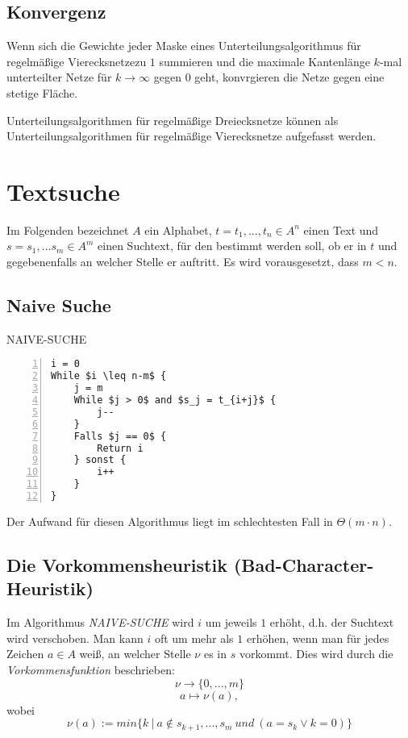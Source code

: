 \subsection{Konvergenz}
Wenn sich die Gewichte jeder Maske eines Unterteilungsalgorithmus für regelmäßige Vierecksnetzezu \(1\) summieren und die maximale Kantenlänge \(k\)-mal unterteilter Netze für \(k \rightarrow \infty\) gegen \(0\) geht, konvrgieren die Netze gegen eine stetige Fläche.

Unterteilungsalgorithmen für regelmäßige Dreiecksnetze können als Unterteilungsalgorithmen für regelmäßige Vierecksnetze aufgefasst werden.



\section{Textsuche}
Im Folgenden bezeichnet \(A\) ein Alphabet, \(t = t_1,...,t_n \in A^n\) einen Text und \(s = s_1,...s_m \in A^m\) einen Suchtext, für den bestimmt werden soll, ob er in \(t\) und gegebenenfalls an welcher Stelle er auftritt. Es wird vorausgesetzt, dass \(m < n\).

\subsection{Naive Suche}
\begin{minipage}{\textwidth}
NAIVE-SUCHE
\begin{lstlisting}[frame=single,numbers=left,mathescape]
i = 0
While $i \leq n-m$ {
	j = m
	While $j > 0$ and $s_j = t_{i+j}$ {
		j--
	}
	Falls $j == 0$ {
		Return i
	} sonst {
		i++
	}
}
\end{lstlisting}
\end{minipage}
Der Aufwand für diesen Algorithmus liegt im schlechtesten Fall in \(\Theta(m\cdot n)\).


\subsection{Die Vorkommensheuristik (Bad-Character-Heuristik)}
Im Algorithmus \textit{NAIVE-SUCHE} wird \(i\) um jeweils \(1\) erhöht, d.h. der Suchtext wird verschoben. Man kann \(i\) oft um mehr als \(1\) erhöhen, wenn man für jedes Zeichen \(a \in A\) weiß, an welcher Stelle \(\nu\) es in \(s\) vorkommt. Dies wird durch die \textit{Vorkommensfunktion} beschrieben:
\[\nu \rightarrow \{0,...,m\}\]
\[a \mapsto \nu(a),\]
wobei
\[\nu(a) := min\{k~|~a \notin s_{k+1},...,s_m~und~(a=s_k \lor k=0)\}\]

